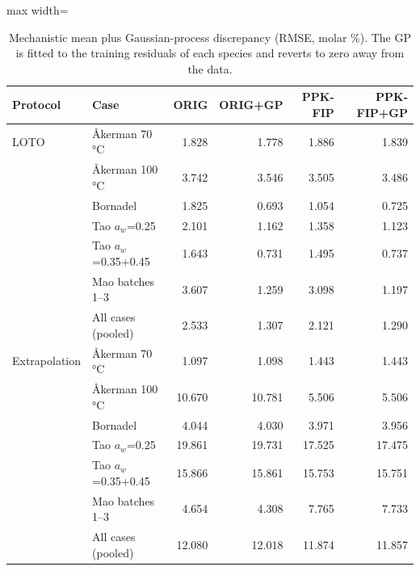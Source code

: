 \begin{table}[t]
\centering
\caption{Mechanistic mean plus Gaussian-process discrepancy (RMSE, molar \%). The GP is fitted to the training residuals of each species and reverts to zero away from the data.}\label{tab:hybrid}
\footnotesize
\begin{adjustbox}{max width=\linewidth}
\begin{tabular}{llrrrr}
\toprule
Protocol & Case & ORIG & ORIG+GP & PPK-FIP & PPK-FIP+GP \\
\midrule
LOTO & Åkerman 70\,°C & 1.828 & 1.778 & 1.886 & 1.839 \\
 & Åkerman 100\,°C & 3.742 & 3.546 & 3.505 & 3.486 \\
 & Bornadel & 1.825 & 0.693 & 1.054 & 0.725 \\
 & Tao $a_w$=0.25 & 2.101 & 1.162 & 1.358 & 1.123 \\
 & Tao $a_w$=0.35+0.45 & 1.643 & 0.731 & 1.495 & 0.737 \\
 & Mao batches 1--3 & 3.607 & 1.259 & 3.098 & 1.197 \\
 & All cases (pooled) & 2.533 & 1.307 & 2.121 & 1.290 \\
\midrule
Extrapolation & Åkerman 70\,°C & 1.097 & 1.098 & 1.443 & 1.443 \\
 & Åkerman 100\,°C & 10.670 & 10.781 & 5.506 & 5.506 \\
 & Bornadel & 4.044 & 4.030 & 3.971 & 3.956 \\
 & Tao $a_w$=0.25 & 19.861 & 19.731 & 17.525 & 17.475 \\
 & Tao $a_w$=0.35+0.45 & 15.866 & 15.861 & 15.753 & 15.751 \\
 & Mao batches 1--3 & 4.654 & 4.308 & 7.765 & 7.733 \\
 & All cases (pooled) & 12.080 & 12.018 & 11.874 & 11.857 \\
\bottomrule
\end{tabular}
\end{adjustbox}
\end{table}
